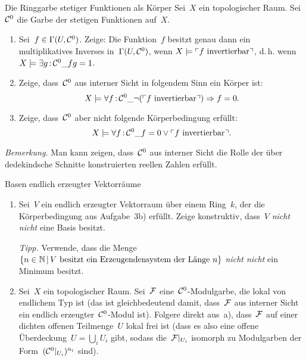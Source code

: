 \documentclass{pizzablatt}
\begin{document}
\begin{aufgabe}{Die Ringgarbe stetiger Funktionen als Körper}
Sei~$X$ ein topologischer Raum. Sei~$\mathcal{C}^0$ die Garbe der stetigen Funktionen
auf~$X$.
\begin{enumerate}
\item Sei~$f \in \Gamma(U,\mathcal{C}^0)$. Zeige: Die Funktion~$f$ besitzt genau dann
ein multiplikatives Inverses in~$\Gamma(U,\mathcal{C}^0)$, wenn $X \models \ulcorner\text{$f$
invertierbar}\urcorner$, d.\,h. wenn $X \models \exists g\,{:}\,\mathcal{C}^0\_ fg = 1$.
\item Zeige, dass~$\mathcal{C}^0$ aus interner Sicht in folgendem Sinn ein Körper ist:
\[ X \models \forall f\,{:}\,\mathcal{C}^0\_ \neg(\ulcorner\text{$f$ invertierbar}\urcorner)
\Rightarrow f = 0. \]
\item Zeige, dass~$\mathcal{C}^0$ aber nicht folgende Körperbedingung erfüllt:
\[ X \models \forall f\,{:}\,\mathcal{C}^0\_ f = 0 \vee \ulcorner\text{$f$ invertierbar}\urcorner. \]
\end{enumerate}
\emph{Bemerkung.} Man kann zeigen, dass~$\mathcal{C}^0$ aus interner Sicht die Rolle der
über dedekindsche Schnitte konstruierten reellen Zahlen erfüllt.
\end{aufgabe}

\begin{aufgabe}{Basen endlich erzeugter Vektorräume}
\begin{enumerate}
\item Sei~$V$ ein endlich erzeugter Vektorraum über einem Ring~$k$, der die Körperbedingung aus
Aufgabe~3b) erfüllt. Zeige konstruktiv, dass~$V$ \emph{nicht nicht} eine Basis
besitzt.

\emph{Tipp.} Verwende, dass die Menge~$\{ n \in \mathbb{N} \,|\, \text{$V$ besitzt ein
Erzeugendensystem der Länge~$n$} \}$ \emph{nicht nicht} ein Minimum
besitzt.

\item Sei~$X$ ein topologischer Raum. Sei~$\mathcal{F}$ eine~$\mathcal{C}^0$-Modulgarbe, die
lokal von endlichem Typ ist (das ist gleichbedeutend damit, dass~$\mathcal{F}$ aus
interner Sicht ein endlich erzeugter~$\mathcal{C}^0$-Modul ist). Folgere direkt aus~a),
dass~$\mathcal{F}$ auf einer dichten offenen Teilmenge~$U$ lokal frei ist (dass es also
eine offene Überdeckung~$U = \bigcup_i U_i$ gibt, sodass die~$\mathcal{F}|_{U_i}$ isomorph
zu Modulgarben der Form~$(\mathcal{C}^0|_{U_i})^{n_i}$ sind).
\end{enumerate}
\end{aufgabe}
\end{document}
